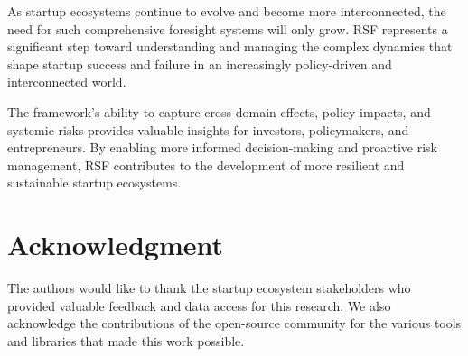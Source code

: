 As startup ecosystems continue to evolve and become more interconnected, the need for such comprehensive foresight systems will only grow. RSF represents a significant step toward understanding and managing the complex dynamics that shape startup success and failure in an increasingly policy-driven and interconnected world.

The framework's ability to capture cross-domain effects, policy impacts, and systemic risks provides valuable insights for investors, policymakers, and entrepreneurs. By enabling more informed decision-making and proactive risk management, RSF contributes to the development of more resilient and sustainable startup ecosystems.

\section*{Acknowledgment}

The authors would like to thank the startup ecosystem stakeholders who provided valuable feedback and data access for this research. We also acknowledge the contributions of the open-source community for the various tools and libraries that made this work possible.

